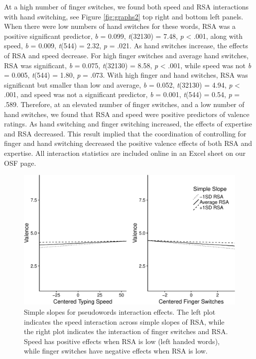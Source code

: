 \documentclass[english,man, mask]{apa6}
\theoremstyle{definition}
\theoremstyle{definition}
\theoremstyle{definition}
\theoremstyle{remark}
\begin{document}
At a high number of finger switches, we found both speed and RSA
interactions with hand switching, see Figure \ref{fig:graphs2} top right
and bottom left panels. When there were low numbers of hand switches for
these words, RSA was a positive significant predictor, \emph{b} = 0.099,
\emph{t}(32130) = 7.48, \emph{p} \textless{} .001, along with speed,
\emph{b} = 0.009, \emph{t}(544) = 2.32, \emph{p} = .021. As hand
switches increase, the effects of RSA and speed decrease. For high
finger switches and average hand switches, RSA was significant, \emph{b}
= 0.075, \emph{t}(32130) = 8.58, \emph{p} \textless{} .001, while speed
was not \emph{b} = 0.005, \emph{t}(544) = 1.80, \emph{p} = .073. With
high finger and hand switches, RSA was significant but smaller than low
and average, \emph{b} = 0.052, \emph{t}(32130) = 4.94, \emph{p}
\textless{} .001, and speed was not a significant predictor, \emph{b} =
0.001, \emph{t}(544) = 0.54, \emph{p} = .589. Therefore, at an elevated
number of finger switches, and a low number of hand switches, we found
that RSA and speed were positive predictors of valence ratings. As hand
switching and finger switching increased, the effects of expertise and
RSA decreased. This result implied that the coordination of controlling
for finger and hand switching decreased the positive valence effects of
both RSA and expertise. All interaction statistics are included online
in an Excel sheet on our OSF page.

\begin{figure}
\centering
\includegraphics{QWERTY_files/figure-latex/graphs-1.pdf}
\caption{\label{fig:graphs}Simple slopes for pseudowords interaction
effects. The left plot indicates the speed interaction across simple
slopes of RSA, while the right plot indicates the interaction of finger
switches and RSA. Speed has positive effects when RSA is low (left
handed words), while finger switches have negative effects when RSA is
low.}
\end{figure}
\end{document}
